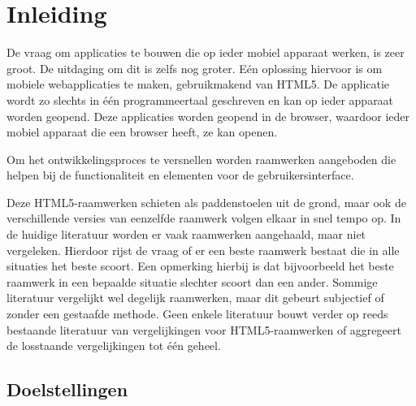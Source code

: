 \chapter{Inleiding} %
\label{inleiding}

De vraag om applicaties te bouwen die op ieder mobiel apparaat werken, is zeer groot.
De uitdaging om dit is zelfs nog groter.
Eén oplossing hiervoor is om mobiele webapplicaties te maken, gebruikmakend van HTML5.
De applicatie wordt zo slechts in één programmeertaal geschreven en kan op ieder apparaat  worden geopend.
Deze applicaties worden geopend in de browser, waardoor ieder mobiel apparaat die een browser heeft, ze kan openen.

Om het ontwikkelingsproces te versnellen worden raamwerken aangeboden die helpen bij de functionaliteit en elementen voor de gebruikersinterface. 

Deze HTML5-raamwerken schieten als paddenstoelen uit de grond, maar ook de verschillende versies van eenzelfde raamwerk volgen elkaar in snel tempo op.
In de huidige literatuur worden er vaak raamwerken aangehaald, maar niet vergeleken.
Hierdoor rijst de vraag of er een beste raamwerk bestaat die in alle situaties het beste scoort.
Een opmerking hierbij is dat bijvoorbeeld het beste raamwerk in een bepaalde situatie slechter scoort dan een ander.
Sommige literatuur vergelijkt wel degelijk raamwerken, maar dit gebeurt subjectief of zonder een gestaafde methode.
Geen enkele literatuur bouwt verder op reeds bestaande literatuur van vergelijkingen voor HTML5-raamwerken of aggregeert de losstaande vergelijkingen tot één geheel.

\section{Doelstellingen} %

